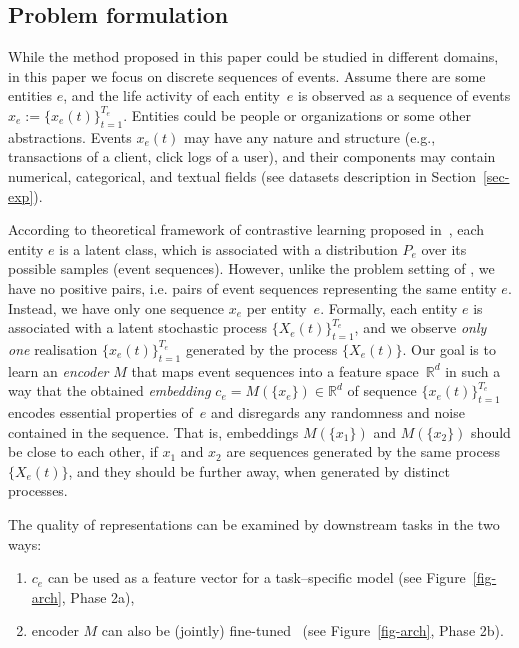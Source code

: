 \documentclass[sigconf, anonymous]{acmart}
\newcommand{\R}{\mathbb{R}}
\begin{document}
\subsection{Problem formulation} \label{sec:problem setting}

While the method proposed in this paper could be studied in different domains, in this paper we focus on discrete sequences of events. Assume there are some entities $e$, and the life activity of each entity~$e$ is observed as a sequence of events $x_e:=\{x_e(t)\}^{T_e}_{t=1}$. Entities could be people or organizations or some other abstractions. Events $x_e(t)$ may have any nature and structure (e.g., transactions of a client, click logs of a user), and their components may contain numerical, categorical, and textual fields (see datasets description in Section~\ref{sec-exp}). 

According to theoretical framework of contrastive learning proposed in~\cite{Saunshi2019ICML}, each entity $e$ is a latent class, which is associated with a distribution $P_e$ over its possible samples (event sequences). However, unlike the problem setting of \cite{Saunshi2019ICML}, we have no positive pairs, i.e. pairs of event sequences representing the same entity $e$. Instead, we have only one sequence $x_e$ per entity~$e$. Formally, each entity $e$ is associated with a latent stochastic process $\{X_e(t)\}_{t=1}^{T_e}$, and we observe {\it only one} realisation $\{x_e(t)\}_{t=1}^{T_e}$ generated by the process $\{X_e(t)\}$. Our goal is to learn an \textit{encoder} $M$ that maps event sequences into a feature space~$\R^d$ in such a way that the obtained \textit{embedding} $c_e=M(\{x_e\})\in \R^d$ of sequence $\{x_e(t)\}^{T_e}_{t=1}$ encodes essential properties of~$e$ and disregards any randomness and noise contained in the sequence. That is, embeddings $M(\{x_1\})$ and $M(\{x_2\})$ should be close to each other, if $x_1$ and $x_2$ are sequences generated by the same process $\{X_e(t)\}$, and they should be further away, when generated by distinct processes. 

The quality of representations can be examined by downstream tasks in the two ways:
\begin{enumerate}
\item $c_e$ can be used as a feature vector for a task--specific model (see Figure~\ref{fig-arch}, Phase 2a),
\item encoder $M$ can also be (jointly) fine-tuned~\citep{Yosinski2014HowTA} (see Figure~\ref{fig-arch}, Phase 2b).
\end{enumerate}
\end{document}
